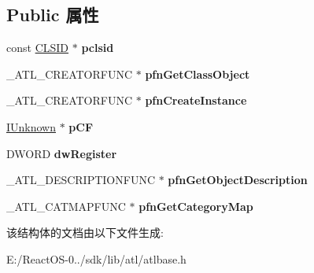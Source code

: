 \subsection*{Public 属性}
\begin{DoxyCompactItemize}
\item 
\mbox{\label{struct_a_t_l_1_1___a_t_l___o_b_j_m_a_p___e_n_t_r_y30_ad57b467868ee64e5966c4b93a6cf52c1}} 
const \hyperlink{struct___i_i_d}{C\+L\+S\+ID} $\ast$ {\bfseries pclsid}
\item 
\mbox{\label{struct_a_t_l_1_1___a_t_l___o_b_j_m_a_p___e_n_t_r_y30_a4ad6356eea74b644ee5dde1a5f918e26}} 
\+\_\+\+A\+T\+L\+\_\+\+C\+R\+E\+A\+T\+O\+R\+F\+U\+NC $\ast$ {\bfseries pfn\+Get\+Class\+Object}
\item 
\mbox{\label{struct_a_t_l_1_1___a_t_l___o_b_j_m_a_p___e_n_t_r_y30_ac0a01f8a2bd13c759cad3c16cee55f41}} 
\+\_\+\+A\+T\+L\+\_\+\+C\+R\+E\+A\+T\+O\+R\+F\+U\+NC $\ast$ {\bfseries pfn\+Create\+Instance}
\item 
\mbox{\label{struct_a_t_l_1_1___a_t_l___o_b_j_m_a_p___e_n_t_r_y30_a3141acfb5859686e1c5481f6588f1dc4}} 
\hyperlink{interface_i_unknown}{I\+Unknown} $\ast$ {\bfseries p\+CF}
\item 
\mbox{\label{struct_a_t_l_1_1___a_t_l___o_b_j_m_a_p___e_n_t_r_y30_a273b7f5977774b7066d48f1c82568be8}} 
D\+W\+O\+RD {\bfseries dw\+Register}
\item 
\mbox{\label{struct_a_t_l_1_1___a_t_l___o_b_j_m_a_p___e_n_t_r_y30_a69ac5b1844dcc4d7bdccf034b4c3e60b}} 
\+\_\+\+A\+T\+L\+\_\+\+D\+E\+S\+C\+R\+I\+P\+T\+I\+O\+N\+F\+U\+NC $\ast$ {\bfseries pfn\+Get\+Object\+Description}
\item 
\mbox{\label{struct_a_t_l_1_1___a_t_l___o_b_j_m_a_p___e_n_t_r_y30_a6f8196fab8feca7a1f25a31b6f7b6600}} 
\+\_\+\+A\+T\+L\+\_\+\+C\+A\+T\+M\+A\+P\+F\+U\+NC $\ast$ {\bfseries pfn\+Get\+Category\+Map}
\end{DoxyCompactItemize}


该结构体的文档由以下文件生成\+:\begin{DoxyCompactItemize}
\item 
E\+:/\+React\+O\+S-\/0../sdk/lib/atl/atlbase.\+h\end{DoxyCompactItemize}
